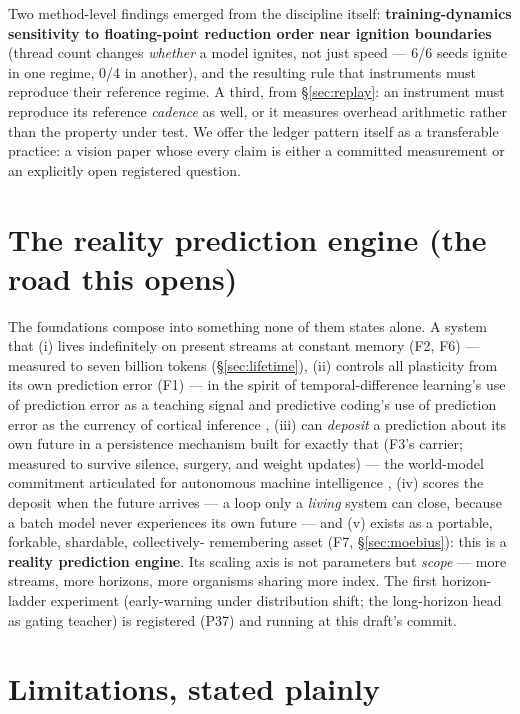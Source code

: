 \documentclass[11pt]{article}
\theoremstyle{definition}
\begin{document}
Two method-level findings emerged from the discipline itself:
\textbf{training-dynamics sensitivity to floating-point reduction order near
ignition boundaries} (thread count changes \emph{whether} a model ignites,
not just speed --- 6/6 seeds ignite in one regime, 0/4 in another), and the
resulting rule that instruments must reproduce their reference regime. A
third, from \S\ref{sec:replay}: an instrument must reproduce its reference
\emph{cadence} as well, or it measures overhead arithmetic rather than the
property under test. We offer the ledger pattern itself as a transferable
practice: a vision paper whose every claim is either a committed measurement
or an explicitly open registered question.

\section{The reality prediction engine (the road this opens)}

The foundations compose into something none of them states alone. A system
that (i) lives indefinitely on present streams at constant memory (F2, F6)
--- measured to seven billion tokens (\S\ref{sec:lifetime}), (ii) controls
all plasticity from its own prediction error (F1) --- in the spirit of
temporal-difference learning's use of prediction error as a teaching signal
\cite{sutton1988td} and predictive coding's use of prediction error as the
currency of cortical inference \cite{rao1999predictive}, (iii) can
\emph{deposit} a prediction about its own future in a persistence
mechanism built for exactly that (F3's carrier; measured to survive
silence, surgery, and weight updates) --- the world-model commitment
articulated for autonomous machine intelligence \cite{lecun2022path}, (iv)
scores the deposit when the future arrives --- a loop only a \emph{living}
system can close, because a batch model never experiences its own future
--- and (v) exists as a portable, forkable, shardable, collectively-
remembering asset (F7, \S\ref{sec:moebius}): this is a \textbf{reality
prediction engine}. Its scaling axis is not parameters but \emph{scope} ---
more streams, more horizons, more organisms sharing more index. The first
horizon-ladder experiment (early-warning under distribution shift; the
long-horizon head as gating teacher) is registered (P37) and running at this
draft's commit.

\section{Limitations, stated plainly}
\end{document}
